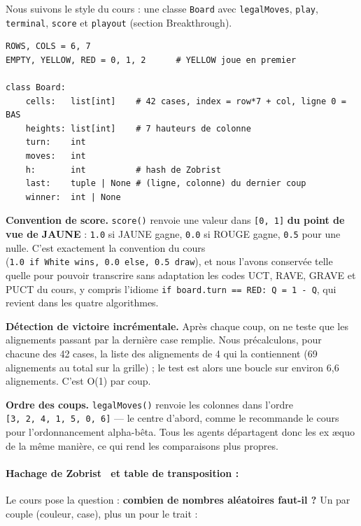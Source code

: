 \documentclass[11pt,a4paper]{article}
\begin{document}
Nous suivons le style du cours : une classe \texttt{Board} avec \texttt{legalMoves}, \texttt{play},
\texttt{terminal}, \texttt{score} et \texttt{playout} (section Breakthrough).

\begin{lstlisting}[caption={L'état de jeu.},label={lst:board}]
ROWS, COLS = 6, 7
EMPTY, YELLOW, RED = 0, 1, 2      # YELLOW joue en premier

class Board:
    cells:   list[int]    # 42 cases, index = row*7 + col, ligne 0 = BAS
    heights: list[int]    # 7 hauteurs de colonne
    turn:    int
    moves:   int
    h:       int          # hash de Zobrist
    last:    tuple | None # (ligne, colonne) du dernier coup
    winner:  int | None
\end{lstlisting}

\textbf{Convention de score.} \texttt{score()} renvoie une valeur dans \texttt{{[}0,\ 1{]}} \textbf{du point de
vue de JAUNE} : \texttt{1.0} si JAUNE gagne, \texttt{0.0} si ROUGE gagne, \texttt{0.5} pour une nulle.
C'est exactement la convention du cours (\texttt{1.0\ if\ White\ wins,\ 0.0\ else,\ 0.5\ draw}), et nous l'avons conservée telle quelle pour pouvoir transcrire sans
adaptation les codes UCT, RAVE, GRAVE et PUCT du cours, y compris l'idiome
\texttt{if\ board.turn\ ==\ RED:\ Q\ =\ 1\ -\ Q}, qui revient dans les quatre
algorithmes.

\textbf{Détection de victoire incrémentale.} Après chaque coup, on ne teste que les
alignements passant par la dernière case remplie. Nous précalculons, pour chacune
des 42 cases, la liste des alignements de 4 qui la contiennent (69 alignements au
total sur la grille) ; le test est alors une boucle sur environ 6,6 alignements.
C'est O(1) par coup.

\textbf{Ordre des coups.} \texttt{legalMoves()} renvoie les colonnes dans l'ordre
\texttt{{[}3,\ 2,\ 4,\ 1,\ 5,\ 0,\ 6{]}} --- le centre d'abord, comme le recommande le cours pour
l'ordonnancement alpha-bêta. Tous les agents départagent donc les ex æquo de la
même manière, ce qui rend les comparaisons plus propres.

\paragraph{Hachage de Zobrist~\cite{zobrist1970} et table de transposition :}

Le cours pose la question : \textbf{combien de nombres aléatoires faut-il ?} Un par
couple (couleur, case), plus un pour le trait :
\end{document}
